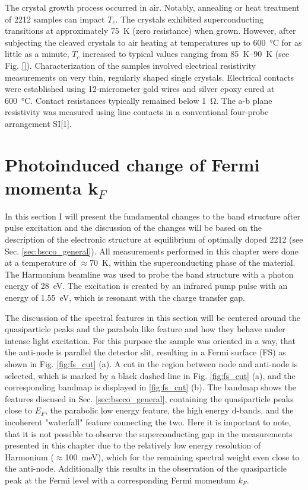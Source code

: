 The crystal growth process occurred in air.
Notably, annealing or heat treatment of 2212 samples can impact $T_c$.
The crystals exhibited superconducting transitions at approximately \qty{75}{\kelvin} (zero resistance) when grown.
However, after subjecting the cleaved crystals to air heating at temperatures up to \qty{600}{\degreeCelsius} for as little as a minute, $T_c$ increased to typical values ranging from \qtyrange{85}{90}{\kelvin} (see Fig. \ref{}).
Characterization of the samples involved electrical resistivity measurements on very thin, regularly shaped single crystals. Electrical contacts were established using 12-micrometer gold wires and silver epoxy cured at \qty{600}{\degreeCelsius}.
Contact resistances typically remained below \qty{1}{\ohm}.
The a-b plane resistivity was measured using line contacts in a conventional four-probe arrangement \cite{} SI[1].

\section{Photoinduced change of Fermi momenta k$_F$}
\label{sec:larger_effect}

In this section I will present the fundamental changes to the band structure after pulse excitation and the discussion of the changes will be based on the description of the electronic structure at equilibrium of optimally doped 2212 (see Sec. \ref{sec:bscco_general}).
All measurements performed in this chapter were done at a temperature of $\approx$\qty{70}{\kelvin}, within the superconducting phase of the material.
The Harmonium beamline \cite{arrell_harmonium_2017} was used to probe the band structure with a photon energy of \qty{28}{\electronvolt}.
The excitation is created by an infrared pump pulse with an energy of \qty{1.55}{\electronvolt}, which is resonant with the charge transfer gap.

The discussion of the spectral features in this section will be centered around the quasiparticle peaks and the parabola like feature and how they behave under intense light excitation.
For this purpose the sample was oriented in a way, that the anti-node is parallel the detector slit, resulting in a Fermi surface (FS) as shown in Fig. \ref{fig:fs_cut} (a).
A cut in the region between node and anti-node is selected, which is marked by a black dashed line in Fig. \ref{fig:fs_cut} (a), and the corresponding bandmap is displayed in \ref{fig:fs_cut} (b).
The bandmap shows the features discused in Sec. \ref{sec:bscco_general}, containing the quasiparticle peaks close to $E_F$, the parabolic low energy feature, the high energy  d-bands, and the incoherent "waterfall" feature connecting the two.
Here it is important to note, that it is not possible to observe the superconducting gap in the measurements presented in this chapter due to the relatively low energy resolution of Harmonium ($\approx$\qty{100}{\milli\electronvolt}), which for the remaining spectral weight even close to the anti-node.
Additionally this results in the observation of the quasiparticle peak at the Fermi level with a corresponding Fermi momentum $k_F$.

